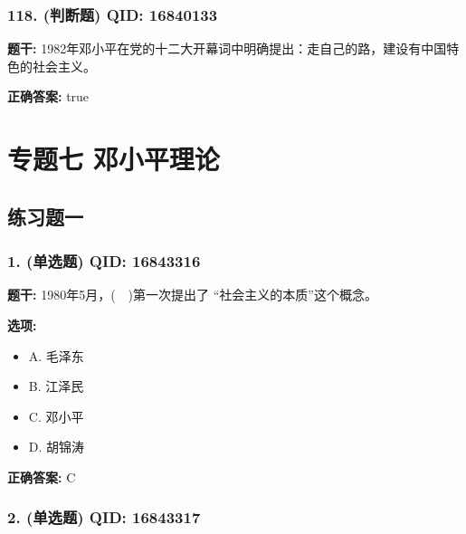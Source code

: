 \documentclass[12pt,UTF8]{ctexart}
\begin{document}
\vspace{0.3em}\hrulefill\vspace{0.7em}

\subsubsection*{118. (判断题) \small QID: 16840133}

\textbf{题干:}
1982年邓小平在党的十二大开幕词中明确提出：走自己的路，建设有中国特色的社会主义。

\textbf{正确答案:}
true

\vspace{0.3em}\hrulefill\vspace{0.7em}

\section*{专题七 邓小平理论}
\hrulefill

\subsection*{练习题一}

\subsubsection*{1. (单选题) \small QID: 16843316}

\textbf{题干:}
1980年5月，(  )第一次提出了 “社会主义的本质”这个概念。

\textbf{选项:}
\begin{itemize}[leftmargin=*]

  \item A. 毛泽东

  \item B. 江泽民

  \item C. 邓小平

  \item D. 胡锦涛

\end{itemize}

\textbf{正确答案:}
C

\vspace{0.3em}\hrulefill\vspace{0.7em}

\subsubsection*{2. (单选题) \small QID: 16843317}
\end{document}

